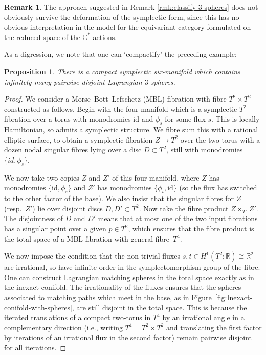 \documentclass[pdftex]{sigma}
\def\bC{\mathbb{C}}
\def\bR{\mathbb{R}}
\newcommand{\id}{\mathrm{id}}
\newtheorem{prop}[thm]{Proposition}
\theoremstyle{definition}
\newtheorem{rmk}[thm]{Remark}
\numberwithin{equation}{section}
\begin{document}
\begin{rmk}
 The approach suggested in Remark \ref{rmk:classify 3-spheres} does not obviously survive the deformation of the symplectic form, since this has no obvious interpretation in the model for the equivariant category formulated on the reduced space of the $\bC^*$-actions.
\end{rmk}


 As a digression, we note that one can `compactify' the preceding example:

 \begin{prop}
 There is a compact symplectic six-manifold which contains infinitely many pairwise disjoint Lagrangian $3$-spheres.
 \end{prop}

\begin{proof}
 We consider a Morse--Bott--Lefschetz (MBL) fibration with fibre $T^2\times T^2$ constructed as follows. Begin with the four-manifold which is a symplectic $T^2$-fibration over a torus with monodromies $\id$ and $\phi_s$ for some flux $s$. This is locally Hamiltonian, so admits a symplectic structure. We fibre sum this with a rational elliptic surface, to obtain a symplectic fibration $Z \to T^2$ over the two-torus with a dozen nodal singular fibres lying over a disc $D \subset T^2$, still with monodromies $\{id,\phi_s\}$.

 We now take two copies $Z$ and $Z'$ of this four-manifold, where $Z$ has monodromies $\{\id,\phi_s\}$ and $Z'$ has monodromies $\{\phi_t,\id\}$ (so the flux has switched to the other factor of the base). We also insist that the singular fibres for $Z$ (resp.~$Z'$) lie over disjoint discs $D,D' \subset T^2$. Now take the fibre product $Z \times_{T^2} Z'$. The disjointness of $D$ and $D'$ means that at most one of the two input fibrations has a singular point over a given $p\in T^2$, which ensures that the fibre product is the total space of a MBL fibration with general fibre~$T^4$.

 We now impose the condition that the non-trivial fluxes $s,t \in H^1(T^2;\bR) \cong \bR^2$ are irrational, so have infinite order in the symplectomorphism group of the fibre. One can construct Lagrangian matching spheres in the total space exactly as in the inexact conifold. The irrationality of the fluxes ensures that the spheres associated to matching paths which meet in the base, as in Figure~\ref{fig:Inexact-conifold-with-spheres}, are still disjoint in the total space. This is because the iterated translations of a compact two-torus in $T^4$ by an irrational angle in a complementary direction (i.e., writing $T^4 = T^2 \times T^2$ and translating the first factor by iterations of an irrational flux in the second factor) remain pairwise disjoint for all iterations.
\end{proof}
\end{document}
